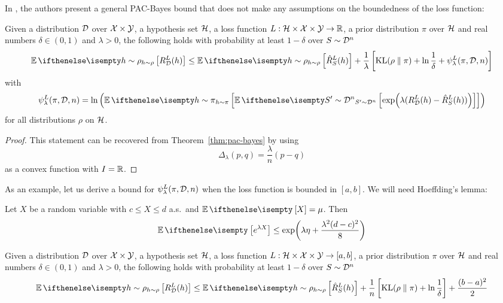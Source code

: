 In \cite{alquier2016properties}, the authors present a general PAC-Bayes bound
that does not make any assumptions on the boundedness of the loss function:

\begin{theorem}
  \label{thm:alquier}
  Given a distribution $\mathcal{D}$ over $\mathcal{X} \times \mathcal{Y}$, a hypothesis set $\mathcal{H}$, a
  loss function $L : \mathcal{H} \times \mathcal{X} \times \mathcal{Y} \to \mathbb{R}$, a prior distribution
  $\pi$ over $\mathcal{H}$ and real numbers $\delta \in (0, 1)$ and $\lambda > 0$, the
  following holds with probability at least $1 - \delta$ over $S \sim \mathcal{D}^n$
  \begin{equation}
    \label{eq:alquier-bound}
    \Ev[h \sim \rho]{R_\CD^L(h)} \leq \Ev[h \sim \rho]{\hat{R}_S^L(h)} +
    \frac{1}{\lambda}\left[\KL{\rho}{\pi} + \ln \frac{1}{\delta} +
    \psi_\lambda^L(\pi, \CD, n)\right]
  \end{equation}
  with
  \begin{equation}
    \psi_\lambda^L(\pi, \CD, n) = \ln\left(\Ev[h \sim \pi]{\Ev[S' \sim
    \CD^n]{\exp(\lambda(R_\CD^L(h) - \hat{R}_S^L(h)))}}\right)
  \end{equation}
  for all distributions $\rho$ on $\mathcal{H}$.
\end{theorem}

\begin{proof}
  This statement can be recovered from Theorem~\ref{thm:pac-bayes} by using
  \begin{equation}
    \Delta_\lambda(p, q) = \frac{\lambda}{n} (p - q)
  \end{equation}
  as a convex function with $I = \mathbb{R}$.
\end{proof}

As an example, let us derive a bound for $\psi_\lambda^L(\pi, \mathcal{D}, n)$ when the
loss function is bounded in $[a, b]$. We will need Hoeffding's lemma:

\begin{lemma}
  Let $X$ be a random variable with $c \leq X \leq d$ a.s.\ and $\Ev{X} = \mu$.
  Then
  \begin{equation}
    \Ev{e^{\lambda X}} \leq \exp(\lambda \eta + \frac{\lambda^2 (d - c)^2}{8})
  \end{equation}
\end{lemma}

\begin{corollary}
  Given a distribution $\mathcal{D}$ over $\mathcal{X} \times \mathcal{Y}$, a hypothesis set $\mathcal{H}$, a
  loss function $L : \mathcal{H} \times \mathcal{X} \times \mathcal{Y} \to [a, b]$, a prior distribution
  $\pi$ over $\mathcal{H}$ and real numbers $\delta \in (0, 1)$ and $\lambda > 0$, the
  following holds with probability at least $1 - \delta$ over $S \sim \mathcal{D}^n$
  \begin{equation}
    \label{eq:alquier-bound-bounded-loss}
    \Ev[h \sim \rho]{R_\CD^L(h)} \leq \Ev[h \sim \rho]{\hat{R}_S^L(h)} +
    \frac{1}{n}\left[\KL{\rho}{\pi} + \ln \frac{1}{\delta}\right] + \frac{(b -
    a)^2}{2}
  \end{equation}
\end{corollary}

